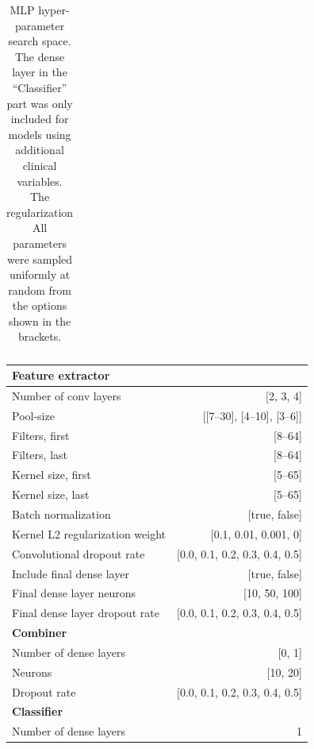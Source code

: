 \documentclass[preprint]{elsarticle}
\begin{document}
\begin{table}[H]
\begin{adjustbox}{center}
\begin{tabular}{@{}lr@{}}
\bottomrule
\end{tabular}
\end{adjustbox}
\caption{MLP hyper-parameter search space. The dense layer in the ``Classifier'' part was only included for models using additional clinical variables. The regularization  All parameters were sampled uniformly at random from the options shown in the brackets.}
\label{table:mlp}
\end{table}
\renewcommand{\arraystretch}{1}


\renewcommand{\arraystretch}{1.2}
\begin{table}[H]
  \centering
  \scriptsize
\begin{adjustbox}{center}
\begin{tabular}{@{}lr@{}}
\toprule
\textbf{Feature extractor}  & \\
\midrule
{Number of conv layers}     & [2, 3, 4] \\
{Pool-size}                 & [[7--30], [4--10], [3--6]] \\
{Filters, first}            & [8--64] \\
{Filters, last}             & [8--64] \\
{Kernel size, first}        & [5--65] \\
{Kernel size, last}         & [5--65] \\
{Batch normalization}       & [true, false] \\
{Kernel L2 regularization weight}              & [0.1, 0.01, 0.001, 0] \\
{Convolutional dropout rate}                  & [0.0, 0.1, 0.2, 0.3, 0.4, 0.5] \\
{Include final dense layer}    & [true, false] \\
{Final dense layer neurons}                   & [10, 50, 100] \\
{Final dense layer dropout rate}             & [0.0, 0.1, 0.2, 0.3, 0.4, 0.5] \\
\midrule
\textbf{Combiner}           & \\
\midrule
{Number of dense layers}    & [0, 1] \\
{Neurons}                   & [10, 20] \\
{Dropout rate}                  & [0.0, 0.1, 0.2, 0.3, 0.4, 0.5] \\
\midrule
\textbf{Classifier}         & \\
\midrule
{Number of dense layers}    & 1 \\

\end{tabular}
\end{adjustbox}
\end{table}
\end{document}
